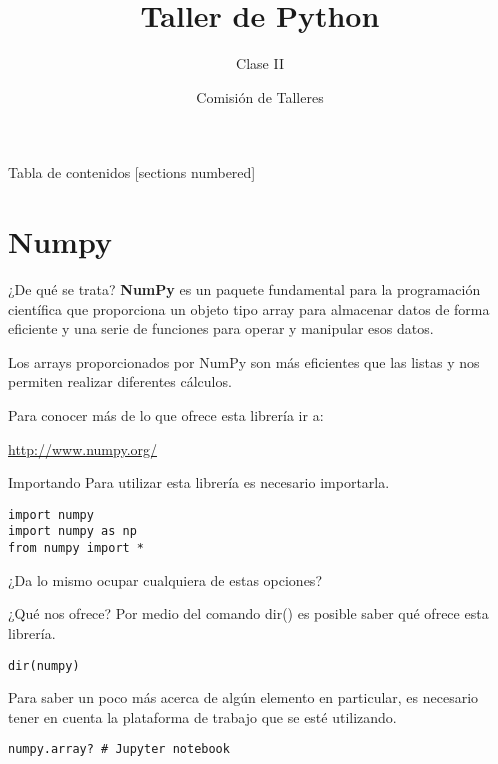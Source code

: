 \documentclass[10pt]{beamer}
\title{Taller de Python}
\subtitle{Clase II}
\date{}
\author{Comisión de Talleres}
\institute{Centro de Estudiantes Tecnológicos}
\begin{document}
\maketitle

\begin{frame}{Tabla de contenidos}
  [sections numbered]
  \tableofcontents[hideallsubsections]
\end{frame}

\section{Numpy}
\begin{frame}{¿De qué se trata?}
\textbf{NumPy} es un paquete fundamental para la programación científica que proporciona un objeto tipo \alert{array} para almacenar datos de forma eficiente y una serie de funciones para operar y manipular esos datos. 

Los arrays proporcionados por NumPy son más eficientes que las listas y nos permiten realizar diferentes cálculos.

Para conocer más de lo que ofrece esta librería ir a:

\begin{center}
	\url{http://www.numpy.org/}
\end{center}
\end{frame}

\begin{frame}[fragile]{Importando}
Para utilizar esta librería es necesario importarla.
\begin{verbatim}
import numpy
import numpy as np 
from numpy import * 
\end{verbatim}
\begin{center}
	¿Da lo mismo ocupar cualquiera de estas opciones?
\end{center}
\end{frame}


\begin{frame}[fragile]{¿Qué nos ofrece?}
Por medio del comando \alert{dir()} es posible saber qué ofrece esta librería.
\begin{verbatim}
dir(numpy) 
\end{verbatim}
Para saber un poco más acerca de algún elemento en particular, es necesario tener en cuenta la plataforma de trabajo que se esté utilizando.
\begin{verbatim}
numpy.array? # Jupyter notebook
\end{verbatim}
\end{frame}
\end{document}
